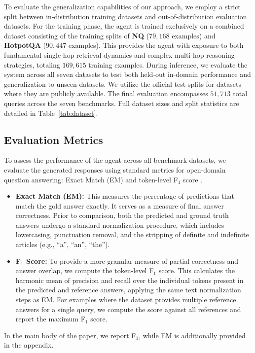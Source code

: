 \documentclass{llmxive}
\begin{document}
To evaluate the generalization capabilities of our approach, we employ a strict split between in-distribution training datasets and out-of-distribution evaluation datasets.  For the training phase, the agent is trained exclusively on a combined dataset consisting of the training splits of \textbf{NQ} ($79,168$ examples) and \textbf{HotpotQA} ($90,447$ examples). This provides the agent with exposure to both fundamental single-hop retrieval dynamics and complex multi-hop reasoning strategies, totaling $169,615$ training examples. During inference, we evaluate the system across all seven datasets to test both held-out in-domain performance and generalization to unseen datasets. We utilize the official test splits for datasets where they are publicly available. The final evaluation encompasses $51,713$ total queries across the seven benchmarks. Full dataset sizes and split statistics are detailed in Table~\ref{tab:dataset}.



\subsection{Evaluation Metrics}
\label{sec:eval-metrics}

To assess the performance of the agent across all benchmark datasets, we evaluate the generated responses using standard metrics for open-domain question answering: Exact Match (EM) and token-level F$_1$ score \citep{rajpurkar-etal-2016-squad}. 

\begin{itemize}[leftmargin=1.2em]
    
    \item \textbf{Exact Match (EM):} This measures the percentage of predictions that match the gold answer exactly. It serves as a measure of final answer correctness. Prior to comparison, both the predicted and ground truth answers undergo a standard normalization procedure, which includes lowercasing, punctuation removal, and the stripping of definite and indefinite articles (e.g., ``a'', ``an'', ``the''). 
    
    \item \textbf{F$_1$ Score:} To provide a more granular measure of partial correctness and answer overlap, we compute the token-level F$_1$ score. This calculates the harmonic mean of precision and recall over the individual tokens present in the predicted and reference answers, applying the same text normalization steps as EM. For examples where the dataset provides multiple reference answers for a single query, we compute the score against all references and report the maximum F$_1$ score.
\end{itemize}
In the main body of the paper, we report F$_1$, while EM  is additionally provided in the appendix.
\end{document}
